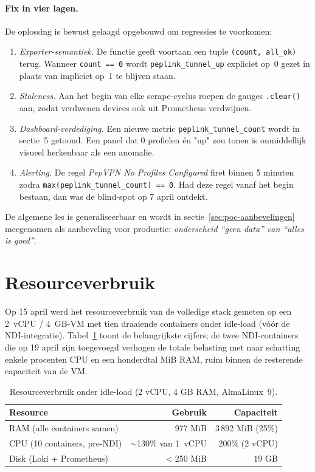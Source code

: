 \paragraph{Fix in vier lagen.} De oplossing is bewust gelaagd opgebouwd om regressies te voorkomen:
\begin{enumerate}
  \item \emph{Exporter-semantiek.} De functie geeft voortaan een tuple \texttt{(count, all\_ok)} terug. Wanneer \texttt{count == 0} wordt \texttt{peplink\_tunnel\_up} expliciet op~0 gezet in plaats van impliciet op~1 te blijven staan.
  \item \emph{Staleness.} Aan het begin van elke scrape-cyclus roepen de gauges \texttt{.clear()} aan, zodat verdwenen devices ook uit Prometheus verdwijnen.
  \item \emph{Dashboard-verdediging.} Een nieuwe metric \texttt{peplink\_tunnel\_count} wordt in sectie~5 getoond. Een panel dat 0 profielen én "up" zou tonen is onmiddellijk visueel herkenbaar als een anomalie.
  \item \emph{Alerting.} De regel \emph{PepVPN No Profiles Configured} firet binnen 5 minuten zodra \texttt{max(peplink\_tunnel\_count) == 0}. Had deze regel vanaf het begin bestaan, dan was de blind-spot op 7 april ontdekt.
\end{enumerate}

De algemene les is generaliseerbaar en wordt in sectie~\ref{sec:poc-aanbevelingen} meegenomen als aanbeveling voor productie: \emph{onderscheid ``geen data'' van ``alles is goed''}.

\section{Resourceverbruik}
\label{sec:poc-resource}

Op 15 april werd het resourceverbruik van de volledige stack gemeten op een 2~vCPU / 4~GB-VM met tien draaiende containers onder idle-load (vóór de NDI-integratie). Tabel~\ref{tab:resource} toont de belangrijkste cijfers; de twee NDI-containers die op 19 april zijn toegevoegd verhogen de totale belasting met naar schatting enkele procenten CPU en een honderdtal MiB RAM, ruim binnen de resterende capaciteit van de VM.

\begin{table}[H]
  \centering
  \caption[Resourceverbruik van de stack]{Resourceverbruik onder idle-load (2 vCPU, 4 GB RAM, AlmaLinux~9).}
  \label{tab:resource}
  \begin{tabular}{l r r}
    \hline
    \textbf{Resource} & \textbf{Gebruik} & \textbf{Capaciteit} \\
    \hline
    RAM (alle containers samen) & 977 MiB & 3\,892 MiB (25\%) \\
    CPU (10 containers, pre-NDI) & $\sim$130\% van 1~vCPU & 200\% (2 vCPU) \\
    Disk (Loki + Prometheus)    & $<$250 MiB & 19 GB \\
    \hline
  \end{tabular}
\end{table}

